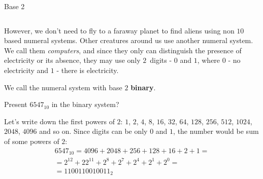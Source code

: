 \documentclass[9pt,aspectratio=169]{beamer}
\begin{document}
\begin{frame}{Base 2}
  \begin{columns}[T]
    \begin{column}{0.5\textwidth}
      However, we don't need to fly to a faraway planet to find aliens using non $10$ based numeral systems. Other creatures around us use another numeral system. We call them \emph{computers}, and since they only can distinguish the presence of electricity or its absence, they may use only $2$~digits - $0$ and $1$, where $0$ - no electricity and $1$ - there is electricity.
      \begin{definition}
        We call the numeral system with base $2$ \textbf{binary}.
      \end{definition}
      \begin{problem}
        Present $6547_{10}$ in the binary system? 
      \end{problem}
      Let's write down the first powers of $2$:
      $1$, $2$, $4$, $8$, $16$, $32$, $64$, $128$, $256$, $512$, $1024$, $2048$, $4096$ and so on.
      Since digits can be only $0$ and $1$, the number would be sum of some powers of $2$:
      \begin{multline*}
        6547_{10} = 4096 + 2048 + 256 + 128 + 16 + 2 + 1 = \\ 
        = 2^{12} + 22^{11} + 2^8 + 2^7 + 2^4 + 2^1 + 2^0 = \\ = 1100110010011_2
      \end{multline*}


\end{column}
\end{columns}
\end{frame}
\end{document}
